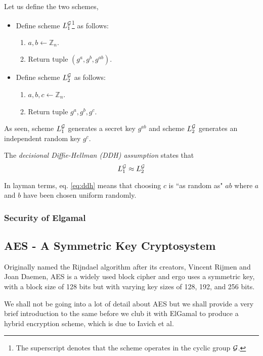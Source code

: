 Let us define the two schemes,
\begin{itemize}
    \item Define scheme \( L_1^{\mathcal{G}} \)\footnote{The superscript denotes that the scheme operates in the cyclic group \( \mathcal{G} \).} as follows: 
    \begin{enumerate}
        \item \( a, b \leftarrow \mathbb{Z}_n \).
        \item Return tuple \( (g^a, g^b, g^{ab}) \).
    \end{enumerate}

    \item Define scheme \( L_2^{\mathcal{G}} \) as follows: 
    \begin{enumerate}
        \item \( a, b, c \leftarrow \mathbb{Z}_n \).
        \item Return tuple \( g^a, g^b, g^c \).
    \end{enumerate}
\end{itemize}

As seen, scheme \( L_1^{\mathcal{G}} \) generates a secret key \( g^{ab} \) and scheme \( L_2^{\mathcal{G}} \) generates an independent random key \( g^c \).

The \textit{decisional Diffie-Hellman (DDH) assumption} states that
\begin{equation} \label{eq:ddh} 
    L_1^{\mathcal{G}} \approx L_2^{\mathcal{G}}
\end{equation}

In layman terms, eq. \ref{eq:ddh} means that choosing \( c \) is ``as random as" \( ab \) where \( a \) and \( b \) have been chosen uniform randomly.

\subsubsection{Security of Elgamal}
\subsection{AES - A Symmetric Key Cryptosystem}
Originally named the Rijndael algorithm after its creators, Vincent Rijmen and Joan Daemen, AES is a widely used block cipher and ergo uses a symmetric key, with a block size of 128 bits but with varying key sizes of 128, 192, and 256 bits.

We shall not be going into a lot of detail about AES but we shall provide a very brief introduction to the same before we club it with ElGamal to produce a hybrid encryption scheme, which is due to Iavich et al.\cite{Iavich_Gnatyuk_Jintcharadze_Polishchuk_Odarchenko_2018}

